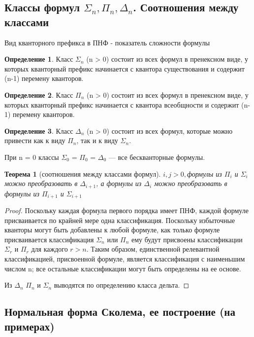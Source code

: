 \documentclass[a4paper]{article}
\newtheorem{theorem}{Теорема}[section]
\theoremstyle{definition}
\newtheorem*{definition}{Определение}
\theoremstyle{remark}
\begin{document}
    \subsection{Классы формул $\Sigma_n, \Pi_n, \Delta_n$. Соотношения между классами}
    Вид кванторного префикса в ПНФ -  показатель сложности формулы
    \begin{definition}
        Класс $\Sigma_n$ (n > 0) состоит из всех формул в пренексном виде, у которых кванторный префикс 
        начинается с квантора существования и содержит (n-1) перемену кванторов.
    \end{definition}
    \begin{definition}
        Класс $\Pi_n$ (n > 0) состоит из всех формул в пренексном виде, у которых кванторный префикс 
    начинается с квантора всеобщности и содержит (n-1) перемену кванторов.
    \end{definition}
    \begin{definition}
        Класс $\Delta_n$ (n > 0) состоит из всех формул, которые можно привести как к виду $\Pi_n$, 
        так и к виду $\Sigma_n$.
    \end{definition}
    
    При n = 0 классы $\Sigma_0$ = $\Pi_0$ = $\Delta_0$ — все бескванторные формулы.

    \begin{theorem}[соотношения между классами формул]
        $i, j > 0,$формулы из $\Pi_i$ и $\Sigma_i$ можно преобразовать в $\Delta_{i+1}$, а
        формулы из $\Delta_{i}$ можно преобразовать в формулы из $\Pi_{i+1}$ и $\Sigma_{i+1}$
    \end{theorem}
    \begin{proof}
        Поскольку каждая формула первого порядка имеет ПНФ, 
        каждой формуле присваивается по крайней мере одна классификация. 
        Поскольку избыточные кванторы могут быть добавлены к любой формуле, как только 
        формуле присваивается классификация ${ \Sigma _{n}}$ 
        или ${ \Pi _{n}}$ ему будут присвоены классификации 
        ${ \Sigma _{r}}$ и ${ \Pi _{r}}$ для каждого $r > n$. 
        Таким образом, единственной релевантной классификацией, присвоенной формуле, 
        является классификация с наименьшим числом n; все остальные 
        классификации могут быть определены на ее основе.

        Из $\Delta_n$ $\Pi_n$ и $\Sigma_n$ выводятся по определению класса дельта.
    \end{proof}
    \subsection{Нормальная форма Сколема, ее построение (на примерах)}
\end{document}
